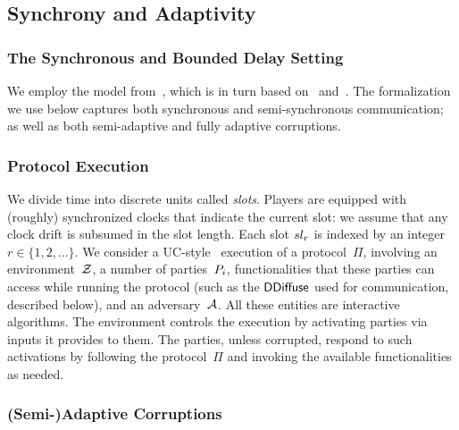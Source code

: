 \subsection{Synchrony and Adaptivity}


\subsubsection{The Synchronous and Bounded Delay Setting}

We employ the model from~\cite{praos}, which is in turn based
on~\cite{ouroboros} and~\cite{backbone}.
The formalization we use below captures both synchronous and semi-syn\-chronous
communication; as well as both semi-adaptive and fully adaptive corruptions.

\subsubsection{Protocol Execution}
\label{sec:prelim-exec}

We divide time into discrete units called
\emph{slots}. %
Players are equipped with (roughly) synchronized clocks that
indicate the current slot: we assume that any clock drift is subsumed in the
slot length.  Each slot $sl_r$ is indexed by an integer $r \in \{1,2,\ldots
\}$.
We consider a UC-style~\cite{uc} execution of a protocol~$\Pi$,
involving an environment~$\mathcal{Z}$, a number of
parties~$P_i$, functionalities that these parties can access while running
the protocol (such as the $\mathsf{DDiffuse}$ used for communication, described below), and
an adversary~$\mathcal{A}$. All these entities are interactive algorithms.  The
environment controls the execution by activating parties via inputs it provides
to them. The parties, unless corrupted, respond to such activations by following
the protocol~$\Pi$ and invoking the available functionalities as needed.

\subsubsection{(Semi-)Adaptive Corruptions}
\label{sec:prelim-corr}

